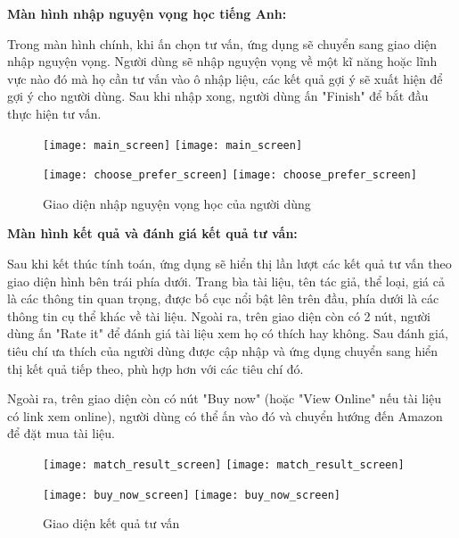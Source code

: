 \pagebreak
\textbf{Màn hình nhập nguyện vọng học tiếng Anh:}
\vskip 0.1in

Trong màn hình chính, khi ấn chọn tư vấn, ứng dụng sẽ chuyển sang giao diện nhập nguyện vọng. Người dùng sẽ nhập nguyện vọng về một kĩ năng hoặc lĩnh vực nào đó mà họ cần tư vấn vào ô nhập liệu, các kết quả gợi ý sẽ xuất hiện để gợi ý cho người dùng. Sau khi nhập xong, người dùng ấn "Finish" để bắt đầu thực hiện tư vấn.\\  

\begin{figure}[H]
  \begin{minipage}[b]{0.50\linewidth}
  	\centering
      \ifpdf
      \texttt{[image: main\_screen]}
    \else
      \texttt{[image: main\_screen]}
    \fi  	
  \end{minipage}
    \begin{minipage}[b]{0.50\linewidth}
  	\centering
      \ifpdf
      \texttt{[image: choose\_prefer\_screen]}
    \else
      \texttt{[image: choose\_prefer\_screen]}
    \fi  	
  \end{minipage}
    \caption{Giao diện nhập nguyện vọng học của người dùng}
    \label{PreferenceInquiryScreen}
\end{figure}

\pagebreak
\textbf{Màn hình kết quả và đánh giá kết quả tư vấn:}
\vskip 0.1in

Sau khi kết thúc tính toán, ứng dụng sẽ hiển thị lần lượt các kết quả tư vấn theo giao diện hình bên trái phía dưới. Trang bìa tài liệu, tên tác giả, thể loại, giá cả là các thông tin quan trọng, được bố cục nổi bật lên trên đầu, phía dưới là các thông tin cụ thể khác về tài liệu. Ngoài ra, trên giao diện còn có 2 nút, người dùng ấn "Rate it" để đánh giá tài liệu xem họ có thích hay không. Sau đánh giá, tiêu chí ưa thích của người dùng được cập nhập và ứng dụng chuyển sang hiển thị kết quả tiếp theo, phù hợp hơn với các tiêu chí đó.

Ngoài ra, trên giao diện còn có nút "Buy now" (hoặc "View Online" nếu tài liệu có link xem online), người dùng có thể ấn vào đó và chuyển hướng đến Amazon để đặt mua tài liệu.	\\    

\begin{figure}[H]
  \begin{minipage}[b]{0.50\linewidth}
  	\centering
      \ifpdf
      \texttt{[image: match\_result\_screen]}
    \else
      \texttt{[image: match\_result\_screen]}
    \fi  	
  \end{minipage}
    \begin{minipage}[b]{0.50\linewidth}
  	\centering
      \ifpdf
      \texttt{[image: buy\_now\_screen]}
    \else
      \texttt{[image: buy\_now\_screen]}
    \fi  	
  \end{minipage}
    \caption{Giao diện kết quả tư vấn}
    \label{RecommendedResultScreen}
\end{figure}
